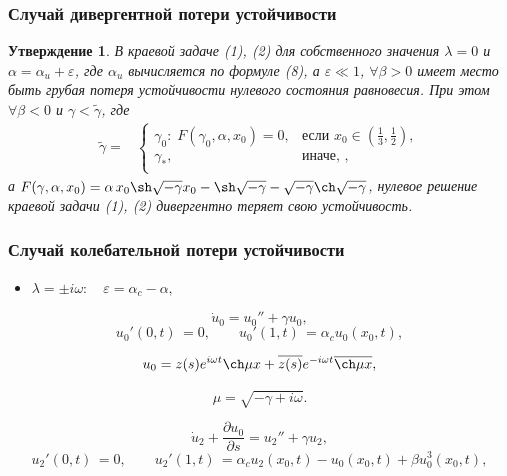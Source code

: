 \documentclass[fullscreen=true, unicode, bookmarks=false]{beamer}
\newtheorem{rustheorem}{Утверждение }
\begin{document}
\begin{frame}
\frametitle{ Случай дивергентной потери устойчивости }

\begin{rustheorem}
В краевой задаче (1), (2) для собственного значения $ \lambda = 0 $ и $ \alpha = \alpha_u + \varepsilon $, где $ \alpha_u $ вычисляется по формуле (8), а $ \varepsilon \ll 1 $, $ \forall \beta > 0 $ имеет место быть грубая потеря устойчивости нулевого состояния равновесия. При этом $ \forall \beta < 0 $ и $ \gamma < \widetilde{\gamma} $, где 
\begin{equation*}
    \begin{matrix}
    \widetilde{\gamma} =
    & \left\{
    \begin{matrix}
        \gamma_0: \; F(\gamma_0, \alpha, x_0) = 0, & \mbox{если } x_0 \in \left( \frac{1}{3}, \frac{1}{2} \right), \\
        \gamma_*, & \mbox{иначе, }, \\
    \end{matrix} \right.
    \end{matrix}
\end{equation*}
а $ F(\gamma, \alpha, x_0) = \alpha\,x_0\sh\sqrt{-\gamma}x_0 - \sh\sqrt{-\gamma} - \sqrt{-\gamma} \ch\sqrt{-\gamma}  $, нулевое решение краевой задачи (1), (2) дивергентно теряет свою устойчивость.
\end{rustheorem}

\end{frame}

\begin{frame}
\frametitle{ Случай колебательной потери устойчивости }

\begin{itemize}
\item { $ \lambda = \pm i \omega: \quad \varepsilon=\alpha_c-\alpha, $
}
\end{itemize}

\medskip

\begin{equation}
	\dot u_0 = u_0'' + \gamma u_0,
\end{equation}
\begin{equation}
	u_0'(0, t) \, = 0, \qquad u_0'(1, t) \, = \alpha_c u_0(x_0, t),
\end{equation}

$$ u_0 = z(s) e^{i \omega t} \ch \mu x + \overline{z(s)} e^{-i \omega t} \overline{\ch \mu x}, $$

$$ \mu = \sqrt{-\gamma+i \omega}. $$

\medskip

\begin{equation}
	\dot u_2 + \frac{\partial u_0}{\partial s} = u_2'' + \gamma u_2,
\end{equation}
\begin{equation}
	u_2'(0, t) \, = 0, \qquad u_2'(1, t) \, = \alpha_c u_2(x_0, t) - u_0(x_0, t) + \beta u_0^3(x_0, t),
\end{equation}

\end{frame}
\end{document}
